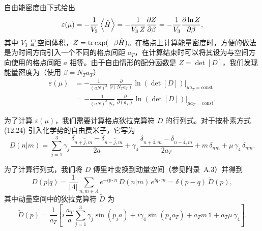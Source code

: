自由能密度由下式给出
\begin{equation}
  \varepsilon(\mu) = -\frac{1}{V_3}\left\langle \hat{H} \right\rangle
    = -\frac{1}{V_3\,Z}\frac{\partial Z}{\partial\beta}
    = -\frac{1}{V_3}\frac{\partial\ln Z}{\partial\beta},
\end{equation}
其中 $V_3$ 是空间体积，$Z = \operatorname{tr}\exp(-\beta\hat{H})$。在格点上计算能量密度时，方便的做法是为时间方向引入一个不同的格点间距 $a_T$，在计算结束时可以将其设为与空间方向使用的格点间距 $a$ 相等。由于自由情形的配分函数是 $Z = \det[D]$，我们发现能量密度为（使用 $\beta = N_T a_T$）
\begin{equation}
\begin{split}
  \varepsilon(\mu) &= -\frac{1}{(aN)^3}\,
    \frac{\partial}{\partial(N_T a_T)}\ln(\det[D])\Bigg|_{\mu a_T=\mathrm{const}}\\
  &= -\frac{1}{(aN)^3\,N_T}\,
    \frac{\partial}{\partial(a_T)}\ln(\det[D])\Bigg|_{\mu a_T=\mathrm{const}}.
\end{split}
\end{equation}

为了计算 $\varepsilon(\mu)$，我们需要计算格点狄拉克算符 $D$ 的行列式。对于按朴素方式 (12.24) 引入化学势的自由费米子，它写为
\begin{equation}
  D(n|m) = \sum_{j=1}^3 \gamma_j\,
    \frac{\delta_{n+\hat{j},m} - \delta_{n-\hat{j},m}}{2a}
    + \gamma_4\,\frac{\delta_{n+\hat{4},m} - \delta_{n-\hat{4},m}}{2a_T}
    + m\,\delta_{nm} + \mu\,\gamma_4\,\delta_{nm}.
\end{equation}

为了计算行列式，我们将 $D$ 傅里叶变换到动量空间（参见附录~A.3）并得到
\begin{equation}
  D(p|q) = \frac{1}{|\Lambda|}\sum_{n,m\in\Lambda} e^{-ip\cdot n}\,
    D(n|m)\,e^{iq\cdot m} = \delta(p-q)\,\tilde{D}(p),
\end{equation}
其中动量空间中的狄拉克算符 $\tilde{D}$ 为
\begin{equation}
  \tilde{D}(p) = \frac{1}{a_T}\left[
    i\,\frac{a_T}{a}\sum_{j=1}^3\gamma_j\sin(p_j a)
    + i\gamma_4\sin(p_4 a_T) + a_T m\,\mathbb{1} + a_T\mu\,\gamma_4
  \right].
\end{equation}

